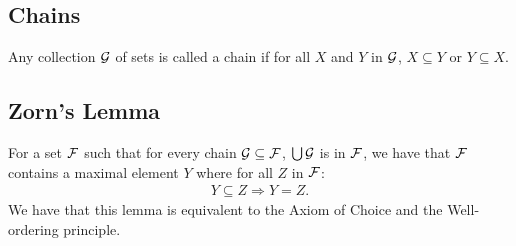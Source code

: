 \subsection{Chains}

Any collection $\mathcal{G}$ of sets is called a chain if for all $X$
and $Y$ in $\mathcal{G}$, $X \subseteq Y$ or $Y \subseteq X$.

\subsection{Zorn's Lemma}

For a set $\mathcal{F}$ such that for every chain $\mathcal{G} \subseteq \mathcal{F}$,
$\bigcup \mathcal{G}$ is in $\mathcal{F}$, we have that $\mathcal{F}$ contains a
maximal element $Y$ where for all $Z$ in $\mathcal{F}$: \begin{align*}
    Y \subseteq Z \Longrightarrow Y = Z.
\end{align*} We have that this lemma is equivalent to the Axiom
of Choice and the Well-ordering principle.


